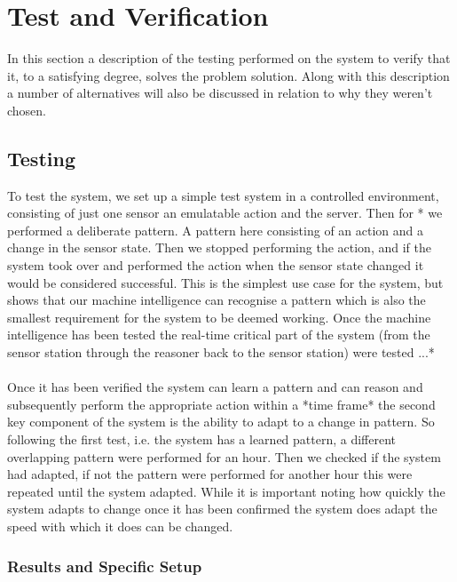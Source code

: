 \section{Test and Verification}
In this section a description of the testing performed on the system to verify that it, to a satisfying degree, solves the problem solution. Along with this description a number of alternatives will also be discussed in relation to why they weren't chosen.

\subsection{Testing}
To test the system, we set up a simple test system in a controlled environment, consisting of just one sensor an emulatable action and the server. Then for * we performed a deliberate pattern. A pattern here consisting of an action and a change in the sensor state. Then we stopped performing the action, and if the system took over and performed the action when the sensor state changed it would be considered successful. This is the simplest use case for the system, but shows that our machine intelligence can recognise a pattern which is also the smallest requirement for the system to be deemed working. Once the machine intelligence has been tested the real-time critical part of the system (from the sensor station through the reasoner back to the sensor station) were tested ...*
\\\\
Once it has been verified the system can learn a pattern and can reason and subsequently perform the appropriate action within a *time frame* the second key component of the system is the ability to adapt to a change in pattern. So following the first test, i.e. the system has a learned pattern, a different overlapping pattern were performed for an hour. Then we checked if the system had adapted, if not the pattern were performed for another hour this were repeated until the system adapted. While it is important noting how quickly the system adapts to change once it has been confirmed the system does adapt the speed with which it does can be changed.
\subsubsection{Results and Specific Setup}

